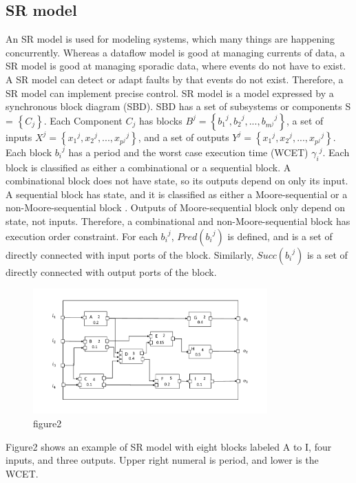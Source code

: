 \documentclass[conference,compsoc]{IEEEtran}
\begin{document}
\subsection{SR model}
An SR model is used for modeling systems, which many things are happening concurrently.
Whereas a dataflow model is good at managing currents of data, a SR model is good at managing sporadic data, where events do not have to exist.
A SR model can detect or adapt faults by that events do not exist.
Therefore, a SR model can implement precise control.
SR model is a model expressed by a synchronous block diagram (SBD).
SBD has a set of subsystems or components S = $\left\{C_j\right\}$. Each Component $C_j$ has blocks 
$B^j = \left\{{{b_1}^j, {b_2}^j,...,{b_{m^j}}^j}\right\}$, a set of inputs $X^j = \left\{{x_1}^j,{x_2}^j,...,{x_{p^j}}^j\right\}$,
and a set of outputs $Y^j = \left\{{x_1}^j,{x_2}^j,...,{x_{p^j}}^j\right\}$.
Each block ${b_i}^j$ has a period and the worst case execution time (WCET) ${\gamma_i}^j$.
Each block is classified as either a combinational or a sequential block.
A combinational block does not have state, so its outputs depend on only its input.
A sequential block has state, and it is classified as either a Moore-sequential or a non-Moore-sequential block \cite{Lublinerman:2009:MCG:1480881.1480893}.
Outputs of Moore-sequential block only depend on state, not inputs.
Therefore, a combinational and  non-Moore-sequential block has execution order constraint.
For each ${b_i}^j$, $Pred({b_i}^j)$ is defined, and is a set of directly connected with input ports of the block.
Similarly, $Succ({b_i}^j)$ is a set of directly connected with output ports of the block.
\begin{figure}
	\centering
	\includegraphics[width=9cm,clip]{figure5.pdf}
	\caption{figure2}
	\label{fig2}
\end{figure}

Figure2 shows an example of SR model with eight blocks labeled A to I, four inputs, and three outputs.
Upper right numeral is period, and lower is the WCET.
\end{document}
